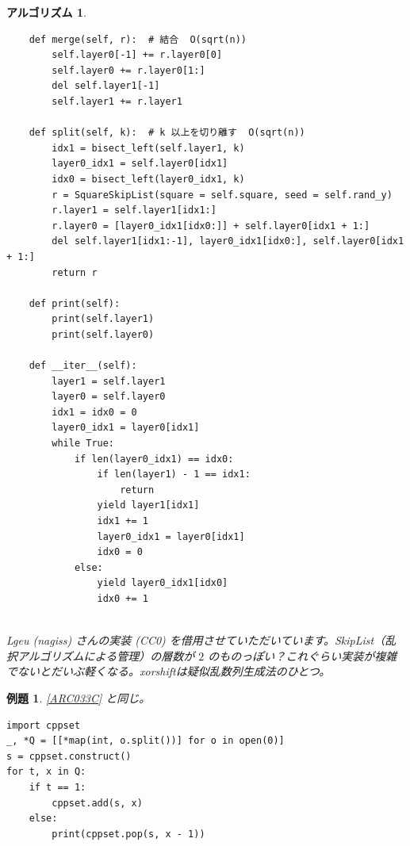 \documentclass[12pt, a4j]{ltjsarticle}
\newtheorem{alg}[thm]{アルゴリズム}
\newtheorem{exm}[thm]{例題}
\newcommand*{\SS}{\vspace{1cm}}
\begin{document}
\begin{alg}
\begin{lstlisting}
    def merge(self, r):  # 結合  O(sqrt(n))
        self.layer0[-1] += r.layer0[0]
        self.layer0 += r.layer0[1:]
        del self.layer1[-1]
        self.layer1 += r.layer1

    def split(self, k):  # k 以上を切り離す  O(sqrt(n))
        idx1 = bisect_left(self.layer1, k)
        layer0_idx1 = self.layer0[idx1]
        idx0 = bisect_left(layer0_idx1, k)
        r = SquareSkipList(square = self.square, seed = self.rand_y)
        r.layer1 = self.layer1[idx1:]
        r.layer0 = [layer0_idx1[idx0:]] + self.layer0[idx1 + 1:]
        del self.layer1[idx1:-1], layer0_idx1[idx0:], self.layer0[idx1 + 1:]
        return r

    def print(self):
        print(self.layer1)
        print(self.layer0)

    def __iter__(self):
        layer1 = self.layer1
        layer0 = self.layer0
        idx1 = idx0 = 0
        layer0_idx1 = layer0[idx1]
        while True:
            if len(layer0_idx1) == idx0:
                if len(layer1) - 1 == idx1:
                    return
                yield layer1[idx1]
                idx1 += 1
                layer0_idx1 = layer0[idx1]
                idx0 = 0
            else:
                yield layer0_idx1[idx0]
                idx0 += 1
\end{lstlisting}
\quad\\
Lgeu (nagiss) さんの実装 (CC0) を借用させていただいています。SkipList（乱択アルゴリズムによる管理）の層数が $2$ のものっぽい？これぐらい実装が複雑でないとだいぶ軽くなる。xorshiftは疑似乱数列生成法のひとつ。
\end{alg}

\SS

\begin{exm} \upshape \ref{ARC033C} と同じ。\\
\begin{lstlisting}
import cppset
_, *Q = [[*map(int, o.split())] for o in open(0)]
s = cppset.construct()
for t, x in Q:
    if t == 1:
        cppset.add(s, x)
    else:
        print(cppset.pop(s, x - 1))
\end{lstlisting}
\end{exm}

\newpage

%
\end{document}
